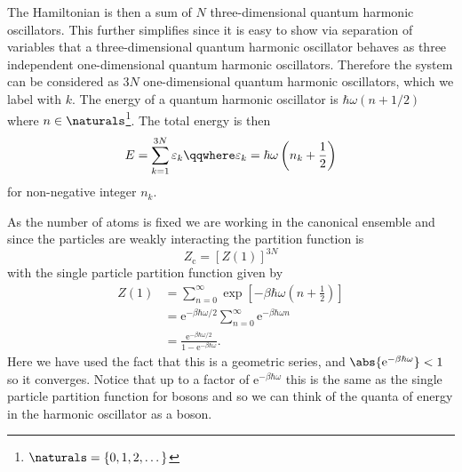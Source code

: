 \documentclass[fleqn]{NotesClass}
\newcommand*{\cpartition}{Z_{\mathrm{c}}}
\newcommand*{\e}{\mathrm{e}}
\begin{document}
    The Hamiltonian is then a sum of \(N\) three-dimensional quantum harmonic oscillators.
    This further simplifies since it is easy to show via separation of variables that a three-dimensional quantum harmonic oscillator behaves as three independent one-dimensional quantum harmonic oscillators.
    Therefore the system can be considered as \(3N\) one-dimensional quantum harmonic oscillators, which we label with \(k\).
    The energy of a quantum harmonic oscillator is \(\hbar\omega(n + 1/2)\) where \(n \in \naturals\)\footnote{\(\naturals = \{0, 1, 2, \dotsc\}\)}.
    The total energy is then
    \begin{equation}
        E = \sum_{k = 1}^{3N} \varepsilon_k \qqwhere \varepsilon_k = \hbar\omega\left( n_k + \frac{1}{2} \right)
    \end{equation}
    for non-negative integer \(n_k\).
    
    As the number of atoms is fixed we are working in the canonical ensemble and since the particles are weakly interacting the partition function is
    \begin{equation}
        \cpartition = [Z(1)]^{3N}
    \end{equation}
    with the single particle partition function given by
    \begin{align}
        Z(1) &= \sum_{n = 0}^{\infty} \exp\left[ -\beta\hbar\omega\left( n + \frac{1}{2} \right) \right]\\
        &= \e^{-\beta\hbar\omega/2} \sum_{n = 0}^{\infty} \e^{-\beta\hbar\omega n}\\
        &= \frac{\e^{-\beta\hbar\omega/2}}{1 - \e^{-\beta\hbar\omega}}.
    \end{align}
    Here we have used the fact that this is a geometric series, and \(\abs{\e^{-\beta\hbar\omega}} < 1\) so it converges.
    Notice that up to a factor of \(\e^{-\beta\hbar\omega}\) this is the same as the single particle partition function for bosons and so we can think of the quanta of energy in the harmonic oscillator as a boson.
    
\end{document}
